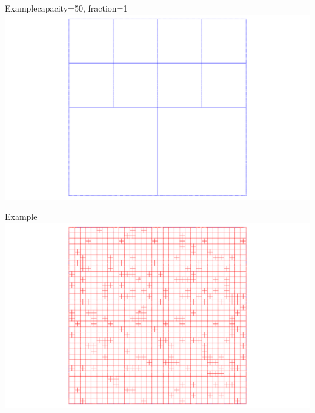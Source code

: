 \documentclass{beamer}
\begin{document}
\begin{frame}{Example}{capacity=50, fraction=1}
    \centering
    \includegraphics[width=\textwidth]{figures/ByC_Globals}
\end{frame}
\begin{frame}{Example}
    \centering
    \includegraphics[width=\textwidth]{figures/ByC_Locals}
\end{frame}
\end{document}
